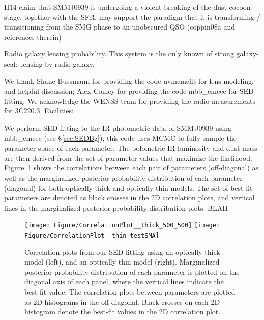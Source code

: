 \documentclass[twocolumn,apj,numberedappendix]{emulateapj}
\begin{document}
H14 claim that SMMJ0939 is undergoing a violent breaking of the dust cocoon stage, together with the SFR, may support the paradigm that it is transforming / transitioning from the SMG phase to an unobscured QSO (coppin08a and references therein)

Radio galaxy lensing probability.
This system is the only known of strong galaxy-scale lensing by radio galaxy.



\acknowledgments
We thank Shane Bussmann for providing the code {\sc uvmcmcfit} for lens modeling, and helpful discussion; Alex Conley for providing the code {\sc mbb\_emcee} for SED fitting. We acknowledge the WENSS team for providing the radio measurements for 3C220.3. 
Facilities: 




\appendix

We perform SED fitting to the IR photometric data of SMM\,J0939 using {\sc mbb\_emcee} (see \S \ref{sec:SEDBg}), this code uses MCMC to fully sample the parameter space of each parameter. The bolometric IR luminosity and dust mass are then derived from the set of parameter values that maximize the likelihood. Figure~\ref{fig:sedlikelihood} shows the correlations between each pair of parameters (off-diagonal) as well as the marginalized posterior probability distribution of each parameter (diagonal) for both optically thick and optically thin models. The set of best-fit parameters are denoted as black crosses in the 2D correlation plots, and vertical lines in the marginalized posterior probability distribution plots. BLAH

\begin{figure}[!tbph]
\centering
\texttt{[image: Figure/CorrelationPlot\_\_thick\_500\_500]}
\texttt{[image: Figure/CorrelationPlot\_\_thin\_testSMA]}
\caption{Correlation plots from our SED fitting using an optically thick
model (left), and an optically thin model (right). Marginalized posterior probability 
distribution of each
parameter is plotted on the diagonal axis of each panel, where the vertical lines indicate the best-fit value. The correlation plots between parameters are plotted as 2D histograms in the off-diagonal. Black crosses on each 2D histogram denote the 
best-fit values in 
the 2D correlation plot.
\label{fig:sedlikelihood}}
\end{figure}
\end{document}
